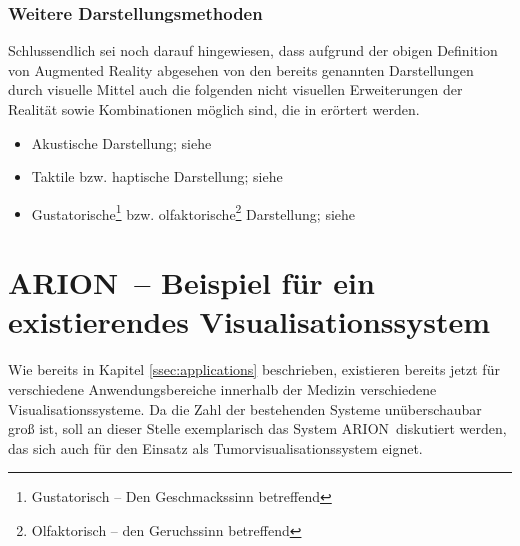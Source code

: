 \documentclass[ngerman,pdftex,paper=A4,DIV=calc,titlepage,12pt]{scrartcl}
\newtheorem[L]{boxedDefinition}{Definition}
\begin{document}
\subsubsection{Weitere Darstellungsmethoden}
Schlussendlich sei noch darauf hingewiesen, dass aufgrund der obigen Definition von Augmented Reality abgesehen von den bereits genannten Darstellungen durch visuelle Mittel auch die folgenden nicht visuellen Erweiterungen der Realität sowie Kombinationen möglich sind, die in \cite[Kapitel 2.4, Seite 36-41]{Toe2010} erörtert werden. 
\begin{itemize}
 \item Akustische Darstellung; siehe \cite[Seite 37]{Toe2010}
 \item Taktile bzw. haptische Darstellung; siehe \cite[Seite 38f.]{Toe2010}
 \item Gustatorische\footnote{Gustatorisch -- Den Geschmackssinn betreffend} bzw. olfaktorische\footnote{Olfaktorisch -- den Geruchssinn betreffend} Darstellung; siehe \cite[Seite 39-41]{Toe2010}
\end{itemize}

\section{ARION\texttrademark\ -- Beispiel für ein existierendes Visualisationssystem}\label{sec:arion}
Wie bereits in Kapitel \vref{ssec:applications} beschrieben, existieren bereits jetzt für verschiedene Anwendungsbereiche innerhalb der Medizin verschiedene Visualisationssysteme. Da die Zahl der bestehenden Systeme unüberschaubar groß ist, soll an dieser Stelle exemplarisch das System ARION\texttrademark\ diskutiert werden, das sich auch für den Einsatz als Tumorvisualisationssystem eignet.
\end{document}
